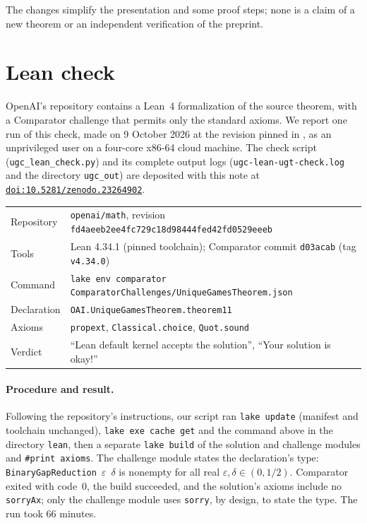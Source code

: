 \documentclass[11pt]{article}
\newcommand{\eps}{\varepsilon}
\newcommand{\depositdoi}{10.5281/zenodo.23264902}
\begin{document}
The changes simplify the presentation and some proof steps; none is a
claim of a new theorem or an independent verification of the preprint.

\appendix
\section{Lean check}\label{app:lean}

OpenAI's repository \cite{UGT} contains a Lean~4 formalization of the
source theorem, with a Comparator challenge that permits only the
standard axioms. We report one run of this check, made on 9 October 2026
at the revision pinned in \cite{UGT}, as an unprivileged user on a
four-core x86-64 cloud machine. The check script
(\texttt{ugc\_lean\_check.py}) and its complete output logs
(\texttt{ugc-lean-ugt-check.log} and the directory \texttt{ugc\_out})
are deposited with this note at
\href{https://doi.org/\depositdoi}{\texttt{doi:\depositdoi}}.

\begin{center}
\footnotesize
\begin{tabular}{@{}ll@{}}
Repository & \texttt{openai/math}, revision
 \texttt{fd4aeeb2ee4fc729c18d98444fed42fd0529eeeb}\\
Tools & Lean 4.34.1 (pinned toolchain); Comparator commit \texttt{d03acab}
 (tag \texttt{v4.34.0})\\
Command & \texttt{lake env comparator
 ComparatorChallenges/UniqueGamesTheorem.json}\\
Declaration & \texttt{OAI.UniqueGamesTheorem.theorem11}\\
Axioms & \texttt{propext}, \texttt{Classical.choice},
 \texttt{Quot.sound}\\
Verdict & ``Lean default kernel accepts the solution'', ``Your solution
 is okay!''
\end{tabular}
\end{center}

\paragraph{Procedure and result.} Following the repository's
instructions, our script ran \texttt{lake update} (manifest and toolchain
unchanged), \texttt{lake exe cache get} and the command above in the
directory \texttt{lean}, then a separate \texttt{lake build} of the
solution and challenge modules and \texttt{\#print axioms}. The challenge
module states the declaration's type: \texttt{BinaryGapReduction}~$\eps$~$\delta$
is nonempty for all real $\eps,\delta\in(0,1/2)$. Comparator exited with
code~$0$, the build succeeded, and the solution's axioms include no
\texttt{sorryAx}; only the challenge module uses \texttt{sorry}, by design,
to state the type. The run took 66 minutes.
\end{document}
